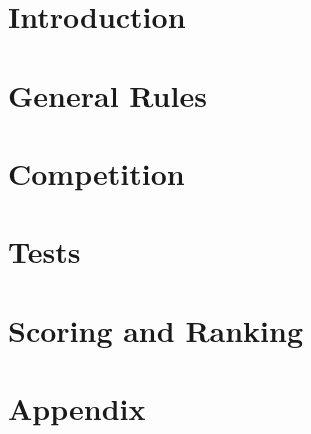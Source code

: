 \documentclass[11pt, twoside, openright, a4paper, chapterprefix]{scrbook}
\begin{document}


\pagestyle{empty}

\tableofcontents
\clearpage

\pagestyle{plain}

\chapter{Introduction}





\chapter{General Rules}


\chapter{Competition}


\chapter{Tests}



\chapter{Scoring and Ranking}


\renewcommand{\glsnamefont}[1]{\textbf{#1}}
\glsaddall
\printglossary[style=altlist, title=Special Terms]
\chapter{Appendix}



\printabx
\printidx
\end{document}
